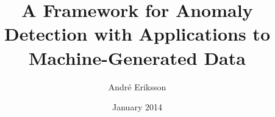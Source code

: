 \title{A Framework for Anomaly Detection with Applications to Machine-Generated Data}
\author{André Eriksson}
\date{January 2014}
